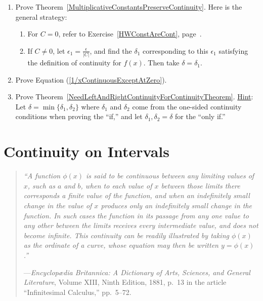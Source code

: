 \begin{multicols}{2}
\begin{enumerate}
\item  Prove Theorem~\ref{MultiplicativeConstantsPreserveContinuity}.
       Here is the general strategy:
     \begin{enumerate}
     \item For $C=0$, refer to Exercise~\ref{HWConstAreCont}, 
           page~\pageref{HWConstAreCont}.
     \item If $C\ne0$, let $\epsilon_1=\frac{\epsilon}{|C|}$, and
           find the $\delta_1$ corresponding to this $\epsilon_1$
           satisfying the definition of continuity for $f(x)$.  Then
           take $\delta=\delta_1$.
      \end{enumerate}
\item Prove Equation (\ref{1/xContinuousExceptAtZero}).
\item Prove Theorem~\ref{NeedLeftAndRightContinuityForContinuityTheorem}.
      \underline{Hint}: Let $\delta=\min\{\delta_1,\delta_2\}$ where
      $\delta_1$ and $\delta_2$ come from the one-sided continuity
      conditions when proving the ``if,'' and let
      $\delta_1,\delta_2=\delta$ for the ``only if.''
\end{enumerate}
\end{multicols}



















\newpage
\section{Continuity on Intervals\label{ContinuityOnIntervalsSection}}
\bigskip

\begin{quote}{\it
``A function $\phi(x)$ is said to be {\it continuous} between any
limiting values of $x$, such as $a$ and $b$, when to each value
of $x$ between those limits there corresponds a finite value of 
the function, and when an indefinitely small change in the
value of $x$ produces only an indefinitely small change in the
function.  In such cases the function in its passage from 
any one value to any other between the limits
receives every intermediate value, and does not become infinite.
This continuity can be readily illustrated by 
taking $\phi(x)$ as the ordinate of a curve, whose equation
may then be written $y=\phi(x)$.''}

\qquad---{\it Encyclop{\ae}dia Britannica:
A Dictionary of Arts, Sciences, and General Literature},
Volume XIII, Ninth Edition, 1881, p.\ 13 in the
article ``Infinitesimal Calculus,'' pp.\ 5--72.
\label{BritQuote}\end{quote}




